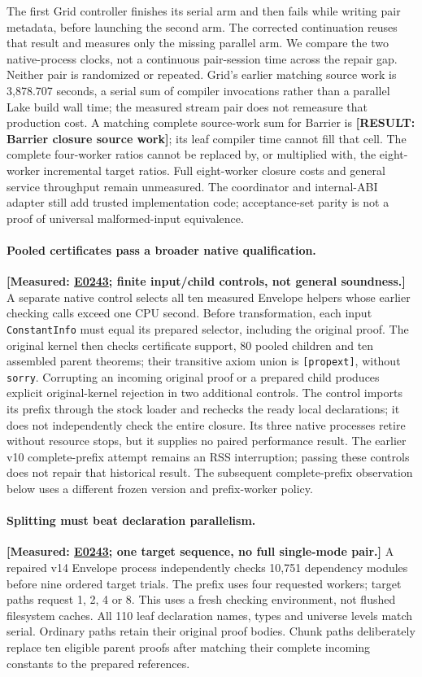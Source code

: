 \documentclass[10pt,twocolumn]{article}
\newcommand{\missing}[1]{\textbf{[RESULT: #1]}}
\newcommand{\measured}[1]{\textbf{[Measured: #1]}}
\newcommand{\expref}[2]{\href{https://github.com/yunwei37/proofserve/blob/main/docs/tmp/build-and-evaluate/step-#1/step-report.md}{E#2}}
\begin{document}
The first Grid controller finishes its serial arm and then fails while
writing pair metadata, before launching the second arm.
The corrected continuation reuses that result and measures only the
missing parallel arm. We compare the two native-process clocks, not a
continuous pair-session time across the repair gap.
Neither pair is randomized or repeated.
Grid's earlier matching source work is 3,878.707 seconds, a serial sum
of compiler invocations rather than a parallel Lake build wall time;
the measured stream pair does not remeasure that production cost.
A matching complete source-work sum for Barrier is \missing{Barrier closure
source work}; its leaf compiler time cannot fill that cell.
The complete four-worker ratios cannot be replaced by, or multiplied with,
the eight-worker incremental target ratios.
Full eight-worker closure costs and general service throughput remain
unmeasured. The coordinator and internal-ABI adapter still add trusted
implementation code; acceptance-set parity is not a proof of universal
malformed-input equivalence.

\paragraph{Pooled certificates pass a broader native qualification.}
\measured{\expref{0243-20261101T091434+0000}{0243}; finite input/child controls, not general soundness.}
A separate native control selects all ten measured Envelope helpers whose
earlier checking calls exceed one CPU second.
Before transformation, each input \texttt{ConstantInfo} must equal its
prepared selector, including the original proof.
The original kernel then checks certificate support, 80 pooled children and
ten assembled parent theorems; their transitive axiom union is
\texttt{[propext]}, without \texttt{sorry}.
Corrupting an incoming original proof or a prepared child produces explicit
original-kernel rejection in two additional controls.
The control imports its prefix through the stock loader and rechecks the
ready local declarations; it does not independently check the entire closure.
Its three native processes retire without resource stops, but it supplies
no paired performance result.
The earlier v10 complete-prefix attempt remains an RSS interruption;
passing these controls does not repair that historical result.
The subsequent complete-prefix observation below uses a different frozen
version and prefix-worker policy.

\paragraph{Splitting must beat declaration parallelism.}
\measured{\expref{0243-20261101T091434+0000}{0243}; one target sequence, no full single-mode pair.}
A repaired v14 Envelope process independently checks 10,751 dependency
modules before nine ordered target trials.
The prefix uses four requested workers; target paths request 1, 2, 4 or 8.
This uses a fresh checking environment, not flushed filesystem caches.
All 110 leaf declaration names, types and universe levels match serial.
Ordinary paths retain their original proof bodies.
Chunk paths deliberately replace ten eligible parent proofs after matching
their complete incoming constants to the prepared references.
\end{document}
